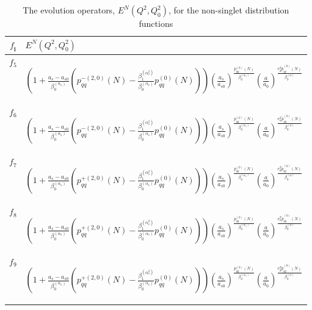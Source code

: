\documentclass[review]{elsarticle}
\begin{document}
\begin{table*}
\centering{}\caption{The evolution operators, $E^{N}(Q^{2},Q_{0}^{2})$, for the non-singlet
distribution functions}
\begin{tabular}{c>{\centering}m{11cm}}
\hline
\textbf{$\mathbf{\mathit{f}_{i}}$} & $E^{N}(Q^{2},Q_{0}^{2})$ \tabularnewline
\hline
$f_{5}$ & \begin{singlespace}
\centering{}$(1+\frac{a_{s}-a_{s0}}{\beta_{0}^{(\alpha_s)}}(p_{qq}^{-(2,0)}(N)-\frac{\beta_{1}^{(\alpha_s^2)}}{\beta_{0}^{(\alpha_s)}}p^{(0)}_{qq}(N)))(\frac{a_{s}}{a_{s0}})^{\frac{p^{(0)}_{qq}(N)}{\beta_{0}^{(\alpha_s)}}}(\frac{a}{a_{0}})^{\frac{e_{d}^{2}\tilde{p}_{qq}^{(0)}(N)}{\beta_{0}^{(\alpha)}}}$
\end{singlespace}
\tabularnewline
\hline
$f_{6}$ & \begin{singlespace}
\centering{}$(1+\frac{a_{s}-a_{s0}}{\beta_{0}^{(\alpha_s)}}(p_{qq}^{-(2,0)}(N)-\frac{\beta_{1}^{(\alpha_s^2)}}{\beta_{0}^{(\alpha_s)}}p^{(0)}_{qq}(N)))(\frac{a_{s}}{a_{s0}})^{\frac{p^{(0)}_{qq}(N)}{\beta_{0}^{(\alpha_s)}}}(\frac{a}{a_{0}})^{\frac{e_{u}^{2}\tilde{p}_{qq}^{(0)}(N)}{\beta_{0}^{(\alpha)}}}$
\end{singlespace}
\tabularnewline
\hline
$f_{7}$ & \begin{singlespace}
\centering{}$(1+\frac{a_{s}-a_{s0}}{\beta_{0}^{(\alpha_s)}}(p_{qq}^{+(2,0)}(N)-\frac{\beta_{1}^{(\alpha_s^2)}}{\beta_{0}^{(\alpha_s)}}p^{(0)}_{qq}(N)))(\frac{a_{s}}{a_{s0}})^{\frac{p^{(0)}_{qq}(N)}{\beta_{0}^{(\alpha_s)}}}(\frac{a}{a_{0}})^{\frac{e_{d}^{2}\tilde{p}_{qq}^{(0)}(N)}{\beta_{0}^{(\alpha)}}}$
\end{singlespace}
\tabularnewline
\hline
$f_{8}$ & \begin{singlespace}
\centering{}$(1+\frac{a_{s}-a_{s0}}{\beta_{0}^{(\alpha_s)}}(p_{qq}^{+(2,0)}(N)-\frac{\beta_{1}^{(\alpha_s^2)}}{\beta_{0}^{(\alpha_s)}}p^{(0)}_{qq}(N)))(\frac{a_{s}}{a_{s0}})^{\frac{p^{(0)}_{qq}(N)}{\beta_{0}^{(\alpha_s)}}}(\frac{a}{a_{0}})^{\frac{e_{u}^{2}\tilde{p}_{qq}^{(0)}(N)}{\beta_{0}^{(\alpha)}}}$
\end{singlespace}
\tabularnewline
\hline
$f_{9}$ & \begin{singlespace}
\centering{}$(1+\frac{a_{s}-a_{s0}}{\beta_{0}^{(\alpha_s)}}(p_{qq}^{+(2,0)}(N)-\frac{\beta_{1}^{(\alpha_s^2)}}{\beta_{0}^{(\alpha_s)}}p^{(0)}_{qq}(N)))(\frac{a_{s}}{a_{s0}})^{\frac{p^{(0)}_{qq}(N)}{\beta_{0}^{(\alpha_s)}}}(\frac{a}{a_{0}})^{\frac{e_{d}^{2}\tilde{p}_{qq}^{(0)}(N)}{\beta_{0}^{(\alpha)}}}$
\end{singlespace}
\tabularnewline
\hline
\end{tabular}\label{table1}
\end{table*}
\end{document}

